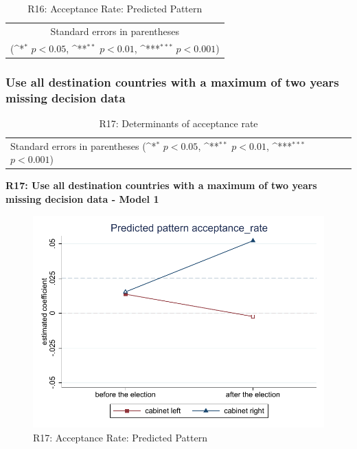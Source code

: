 \documentclass[10pt,a4paper]{scrartcl}
\begin{document}
\begin{table}[!ht]\centering
	\footnotesize
	\renewcommand{\arraystretch}{1.2}
	\def\sym#1{\ifmmode^{#1}\else\(^{#1}\)\fi}
	\caption{R16: Acceptance Rate: Predicted Pattern}
	\begin{tabular}{l*{2}{c}}
		\hline\hline
		
		\hline\hline
		\multicolumn{3}{c}{\footnotesize Standard errors in parentheses} \\
		\multicolumn{3}{c}{\footnotesize (\sym{*} \(p<0.05\), \sym{**} \(p<0.01\), \sym{***} \(p<0.001\))} \\
	\end{tabular}
\end{table}






\clearpage
\FloatBarrier
\subsubsection{Use all destination countries with a maximum of two years missing decision data}
\begin{table}[!ht]\centering
	\renewcommand{\arraystretch}{1.25}
	\small
	\def\sym#1{\ifmmode^{#1}\else\(^{#1}\)\fi}
	\caption{R17: Determinants of acceptance rate}
	\begin{tabular}{l*{3}{c}}
		\hline\hline
		
		\hline\hline
		\multicolumn{4}{l}{\footnotesize Standard errors in parentheses (\sym{*} \(p<0.05\), \sym{**} \(p<0.01\), \sym{***} \(p<0.001\))}\\
	\end{tabular}
\end{table}

\clearpage
\textbf{R17: Use all destination countries with a maximum of two years missing decision data - Model 1}
\begin{figure}[!ht]
	\centering
	\includegraphics[width=1\textwidth]{figures_edited/acceptance_rate_graph1_R17.pdf}
	\caption{R17: Acceptance Rate: Predicted Pattern}
\end{figure}
\end{document}
